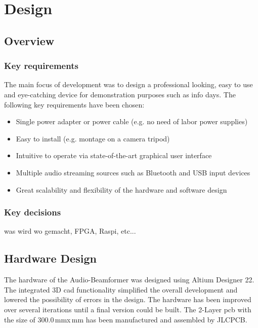 \chapter{Design}
\section{Overview}
\subsection{Key requirements}
The main focus of development was to design a professional looking, easy to use and eye-catching device for demonstration purposes such as info days. The following key requirements have been chosen:

\begin{itemize}
    \item Single power adapter or power cable (e.g. no need of labor power supplies) 
    \item Easy to install (e.g. montage on a camera tripod)
    \item Intuitive to operate via state-of-the-art graphical user interface
    \item Multiple audio streaming sources such as Bluetooth and USB input devices
    \item Great scalability and flexibility of the hardware and software design
\end{itemize}


\subsection{Key decisions}
was wird wo gemacht, FPGA, Raspi, etc...

\newpage
\section{Hardware Design}
The hardware of the Audio-Beamformer was designed using Altium Designer 22. The integrated 3D \acrshort{cad} functionality simplified the overall development and lowered the possibility of errors in the design.
The hardware has been improved over several iterations until a final version could be built. \newline
The 2-Layer \acrfull{pcb} with the size of 300.0\,mm\;x\,mm has been manufactured and assembled by JLCPCB.\newline



